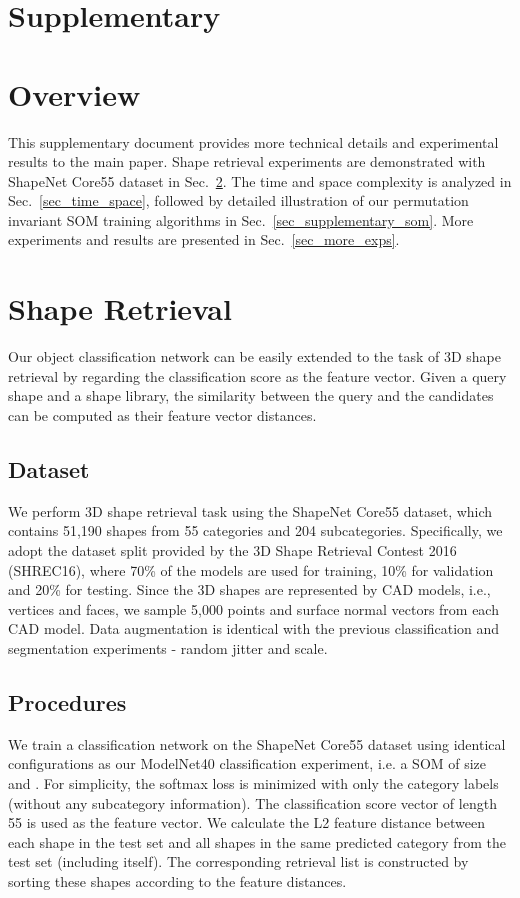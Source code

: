 \documentclass[10pt,twocolumn,letterpaper]{article}
\begin{document}
\newpage
\section*{Supplementary}

\appendix
\iffalse  \fi


\section{Overview}
This supplementary document provides more technical details and experimental results to the main paper. Shape retrieval experiments are demonstrated with ShapeNet Core55 dataset in Sec.~\ref{sec_shape_retrieval}. The time and space complexity is analyzed in Sec.~\ref{sec_time_space}, followed by detailed illustration of our permutation invariant SOM training algorithms in Sec.~\ref{sec_supplementary_som}. More experiments and results are presented in Sec.~\ref{sec_more_exps}.




\section{Shape Retrieval} \label{sec_shape_retrieval}
Our object classification network can be easily extended to the task of 3D shape retrieval by regarding the classification score as the feature vector. Given a query shape and a shape library, the similarity between the query and the candidates can be computed as their feature vector distances.

\subsection{Dataset}
We perform 3D shape retrieval task using the ShapeNet Core55 dataset, which contains 51,190 shapes from 55 categories and 204 subcategories. Specifically, we adopt the dataset split provided by the 3D Shape Retrieval Contest 2016 (SHREC16), where 70\% of the models are used for training, 10\% for validation and 20\% for testing. Since the 3D shapes are represented by CAD models, i.e., vertices and faces, we sample 5,000 points and surface normal vectors from each CAD model. Data augmentation is identical with the previous classification and segmentation experiments - random jitter and scale.

\subsection{Procedures}
We train a classification network on the ShapeNet Core55 dataset using identical configurations as our ModelNet40 classification experiment, i.e. a SOM of size  and . For simplicity, the softmax loss is minimized with only the category labels (without any subcategory information). The classification score vector of length 55 is used as the feature vector. We calculate the L2 feature distance between 
each shape in the test set 
and all shapes in the same predicted category from the test set (including itself). The corresponding retrieval list is constructed by sorting these shapes according to the feature distances.
\end{document}
